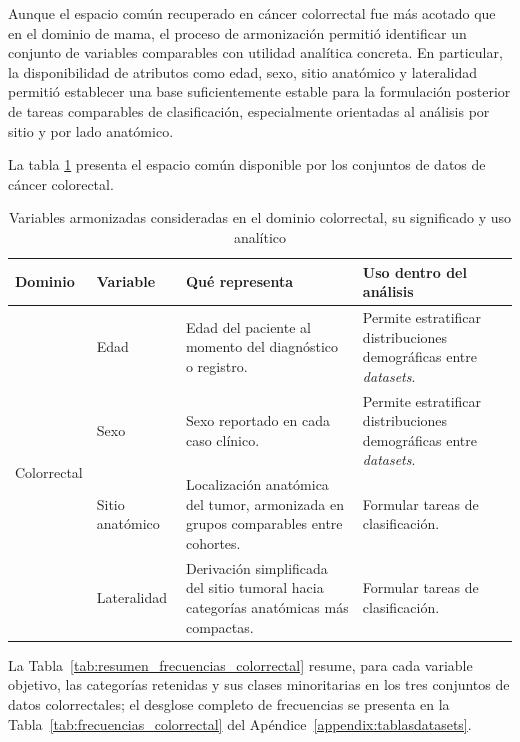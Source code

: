 Aunque el espacio común recuperado en cáncer colorrectal fue más acotado que en el dominio de mama, el proceso de armonización permitió identificar un conjunto de variables comparables con utilidad analítica concreta. En particular, la disponibilidad de atributos como edad, sexo, sitio anatómico y lateralidad permitió establecer una base suficientemente estable para la formulación posterior de tareas comparables de clasificación, especialmente orientadas al análisis por sitio y por lado anatómico.

La tabla \ref{tab:variables_armonizadas_significado_2} presenta el espacio común disponible por los conjuntos de datos de cáncer colorectal.

\begin{table}[H]
\centering
\caption{Variables armonizadas consideradas en el dominio colorrectal, su significado y uso analítico}
\label{tab:variables_armonizadas_significado_2}
\begin{tabular}{p{2.2cm}p{2.8cm}p{5.0cm}p{4.8cm}}
\toprule
\textbf{Dominio} & \textbf{Variable} & \textbf{Qué representa} & \textbf{Uso dentro del análisis} \\
\midrule
\multirow{4}{*}{Colorrectal}
& Edad & Edad del paciente al momento del diagnóstico o registro. & Permite estratificar distribuciones demográficas entre \textit{datasets}. \\
& Sexo & Sexo reportado en cada caso clínico. & Permite estratificar distribuciones demográficas entre \textit{datasets}. \\
& Sitio anatómico & Localización anatómica del tumor, armonizada en grupos comparables entre cohortes. & Formular tareas de clasificación. \\
& Lateralidad & Derivación simplificada del sitio tumoral hacia categorías anatómicas más compactas. & Formular tareas de clasificación.\\
\bottomrule
\end{tabular}
\end{table}

La Tabla~\ref{tab:resumen_frecuencias_colorrectal} resume, para cada variable objetivo, las categorías retenidas y sus clases minoritarias en los tres conjuntos de datos colorrectales; el desglose completo de frecuencias se presenta en la Tabla~\ref{tab:frecuencias_colorrectal} del Apéndice~\ref{appendix:tablasdatasets}.

